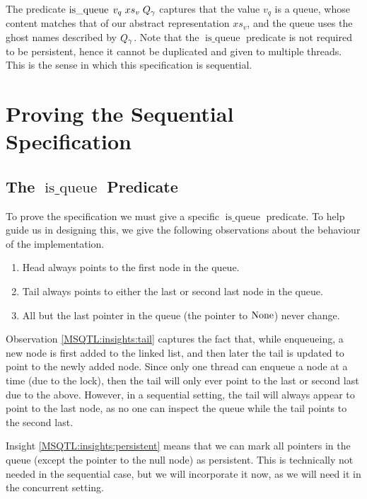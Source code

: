 \documentclass[twoside,11pt,openright]{report}
\newcommand{\isqueue}{\operatorname{is\_queue}}
\begin{document}
The predicate $\isqueue \; v_q \; xs_v \; Q_\gname$ captures that the value $v_q$ is a queue, whose content matches that of our abstract representation $xs_v$, and the queue uses the ghost names described by $Q_\gamma$. Note that the $\isqueue$ predicate is not required to be persistent, hence it cannot be duplicated and given to multiple threads. This is the sense in which this specification is sequential.

\section{Proving the Sequential Specification}
\subsection[The isqueue predicate]{The $\isqueue$ Predicate}
To prove the specification we must give a specific $\isqueue$ predicate. To help guide us in designing this, we give the following observations about the behaviour of the implementation.
\begin{enumerate}
  \item\label{MSQTL:insights:head} Head always points to the first node in the queue.
  \item\label{MSQTL:insights:tail} Tail always points to either the last or second last node in the queue.
  \item\label{MSQTL:insights:persistent} All but the last pointer in the queue (the pointer to $\operatorname{None}$) never change.
\end{enumerate}

Observation \ref{MSQTL:insights:tail} captures the fact that, while enqueueing, a new node is first added to the linked list, and then later the tail is updated to point to the newly added node. Since only one thread can enqueue a node at a time (due to the lock), then the tail will only ever point to the last or second last due to the above. However, in a sequential setting, the tail will always appear to point to the last node, as no one can inspect the queue while the tail points to the second last.

Insight \ref{MSQTL:insights:persistent} means that we can mark all pointers in the queue (except the pointer to the null node) as persistent. This is technically not needed in the sequential case, but we will incorporate it now, as we will need it in the concurrent setting.
\end{document}
